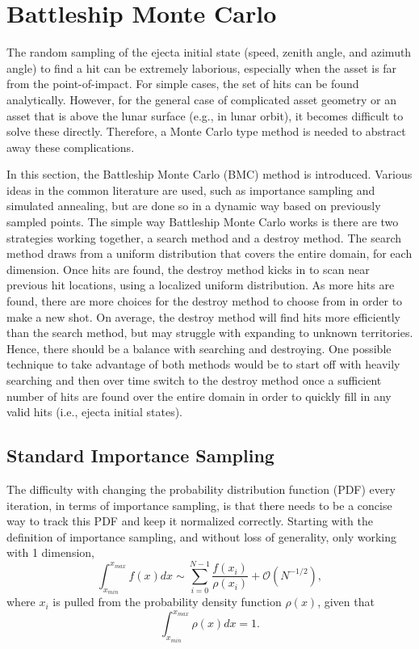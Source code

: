 \documentclass{article}
\begin{document}
\section{Battleship Monte Carlo}

The random sampling of the ejecta initial state (speed, zenith angle, and azimuth angle) to find a hit can be extremely laborious, especially when the asset is far from the point-of-impact. For simple cases, the set of hits can be found analytically. However, for the general case of complicated asset geometry or an asset that is above the lunar surface (e.g., in lunar orbit), it becomes difficult to solve these directly. Therefore, a Monte Carlo type method is needed to abstract away these complications.

In this section, the Battleship Monte Carlo (BMC) method is introduced. Various ideas in the common literature are used, such as importance sampling and simulated annealing, but are done so in a dynamic way based on previously sampled points. The simple way Battleship Monte Carlo works is there are two strategies working together, a search method and a destroy method. The search method draws from a uniform distribution that covers the entire domain, for each dimension. Once hits are found, the destroy method kicks in to scan near previous hit locations, using a localized uniform distribution. As more hits are found, there are more choices for the destroy method to choose from in order to make a new shot. On average, the destroy method will find hits more efficiently than the search method, but may struggle with expanding to unknown territories. Hence, there should be a balance with searching and destroying. One possible technique to take advantage of both methods would be to start off with heavily searching and then over time switch to the destroy method once a sufficient number of hits are found over the entire domain in order to quickly fill in any valid hits (i.e., ejecta initial states).

\subsection{Standard Importance Sampling}

The difficulty with changing the probability distribution function (PDF) every iteration, in terms of importance sampling, is that there needs to be a concise way to track this PDF and keep it normalized correctly. Starting with the definition of importance sampling, and without loss of generality, only working with 1 dimension,
\begin{equation}
\int_{x_{min}}^{x_{max}}f(x)dx \sim \sum_{i=0}^{N-1}\frac{f(x_i)}{\rho(x_i)} + \mathcal{O}(N^{-1/2}),
\end{equation}
where $x_i$ is pulled from the probability density function $\rho(x)$, given that
\begin{equation}
\int_{x_{min}}^{x_{max}}\rho(x)dx = 1.
\end{equation}
\end{document}
